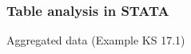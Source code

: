 \documentclass[compress, notes=hide]{beamer}
\begin{document}
\begin{frame}
	\frametitle{Table analysis in STATA}
	\begin{block}{Aggregated data (Example KS 17.1)}
			\begin{figure}[H]
			\begin{center}
				{}
			\end{center}
		\end{figure}
	\end{block}
	
\end{frame}

	
\end{document}
